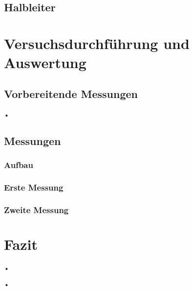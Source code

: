 \documentclass[twoside,colorback,accentcolor=tud4c,11pt]{tudreport}
\begin{document}
\section{Halbleiter}
\chapter{Versuchsdurchführung und Auswertung}
\section{Vorbereitende Messungen}
•
\section{Messungen}
\subsection{Aufbau}
\subsection{Erste Messung}
\subsection{Zweite Messung}
\chapter{Fazit}	
•
\renewcommand{\bibname}{Literatur}
\begin{thebibliography}{0}
 •

\end{thebibliography}
\end{document}
